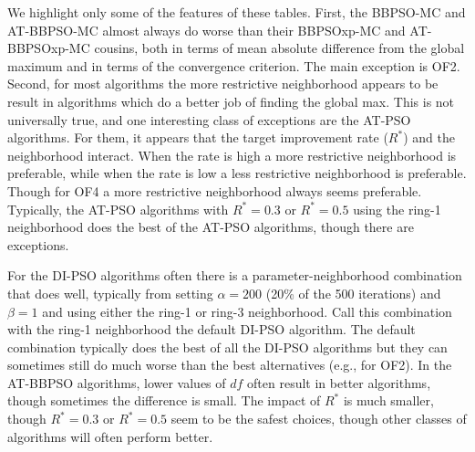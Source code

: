\documentclass[12pt]{article}
\begin{document}
We highlight only some of the features of these tables. First, the BBPSO-MC and AT-BBPSO-MC almost always do worse than their BBPSOxp-MC and AT-BBPSOxp-MC cousins, both in terms of mean absolute difference from the global maximum and in terms of the convergence criterion. The main exception is OF2. Second, for most algorithms the more restrictive neighborhood appears to be result in algorithms which do a better job of finding the global max. This is not universally true, and one interesting class of exceptions are the AT-PSO algorithms. For them, it appears that the target improvement rate ($R^*$) and the neighborhood interact. When the rate is high a more restrictive neighborhood is preferable, while when the rate is low a less restrictive neighborhood is preferable. Though for OF4 a more restrictive neighborhood always seems preferable. Typically, the AT-PSO algorithms with $R^*=0.3$ or $R^*=0.5$ using the ring-1 neighborhood does the best of the AT-PSO algorithms, though there are exceptions.

For the DI-PSO algorithms often there is a parameter-neighborhood combination that does well, typically from setting $\alpha=200$ (20\% of the 500 iterations) and $\beta=1$ and using either the ring-1 or ring-3 neighborhood. Call this combination with the ring-1 neighborhood the default DI-PSO algorithm. The default combination typically does the best of all the DI-PSO algorithms but they can sometimes still do much worse than the best alternatives (e.g., for OF2). In the AT-BBPSO algorithms, lower values of $df$ often result in better algorithms, though sometimes the difference is small. The impact of $R^*$ is much smaller, though $R^*=0.3$ or $R^*=0.5$ seem to be the safest choices, though other classes of algorithms will often perform better. 
\end{document}
